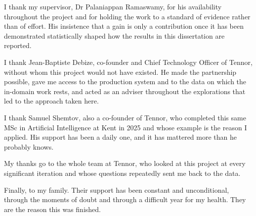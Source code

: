 \documentclass[12pt,a4paper]{report} %
\begin{document}
I thank my supervisor, Dr Palaniappan Ramaswamy, for his availability throughout the project
and for holding the work to a standard of evidence rather than of effort. His insistence
that a gain is only a contribution once it has been demonstrated statistically shaped how
the results in this dissertation are reported.

I thank Jean-Baptiste Debize, co-founder and Chief Technology Officer of Tennor, without whom
this project would not have existed. He made the partnership possible, gave me access to the
production system and to the data on which the in-domain work rests, and acted as an adviser
throughout the explorations that led to the approach taken here.

I thank Samuel Shemtov, also a co-founder of Tennor, who completed this same MSc in Artificial
Intelligence at Kent in 2025 and whose example is the reason I applied. His support has been
a daily one, and it has mattered more than he probably knows.

My thanks go to the whole team at Tennor, who looked at this project at every significant
iteration and whose questions repeatedly sent me back to the data.

Finally, to my family. Their support has been constant and unconditional, through the
moments of doubt and through a difficult year for my health. They are the reason this
was finished.

\clearpage
\pagestyle{fancy}
\tableofcontents
\listoffigures
\listoftables
\cleardoublepage
\pagestyle{fancy}
\lhead{\nouppercase{\rightmark}}
\rhead{\nouppercase{\leftmark}}
\fancyhf{}
\fancyhead[L]{\slshape \nouppercase{\leftmark}}
\fancyhead[R]{\thepage}
\renewcommand{\headrulewidth}{0.4 pt}
\renewcommand{\footrulewidth}{0 pt}


\cleardoublepage


\cleardoublepage


\cleardoublepage

\end{document}
